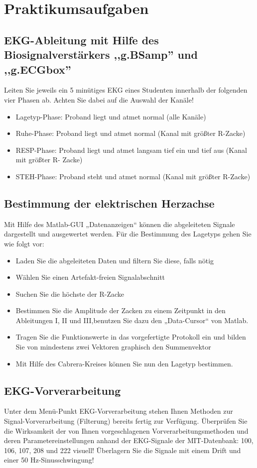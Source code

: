 \documentclass[a4paper,12pt,titlepage]{scrartcl}
\begin{document}
\section{Praktikumsaufgaben}
\subsection{EKG-Ableitung mit Hilfe des Biosignalverstärkers ,,g.BSamp'' und ,,g.ECGbox''}
Leiten Sie jeweils ein 5 minütiges EKG eines Studenten innerhalb der folgenden vier Phasen ab. Achten Sie dabei auf die Auswahl der Kanäle!
\begin{itemize}
    \item Lagetyp-Phase: Proband liegt und atmet normal (alle Kanäle)
    \item Ruhe-Phase: Proband liegt und atmet normal (Kanal mit größter R-Zacke)
    \item RESP-Phase: Proband liegt und atmet langsam tief ein und tief aus (Kanal mit größter R- Zacke)
    \item STEH-Phase: Proband steht und atmet normal (Kanal mit größter R-Zacke)
\end{itemize}

\subsection{Bestimmung der elektrischen Herzachse}
Mit Hilfe des Matlab-GUI „Datenanzeigen“ können die abgeleiteten Signale dargestellt und ausgewertet werden. Für die Bestimmung des Lagetyps gehen Sie wie folgt vor:
\begin{itemize}
    \item Laden Sie die abgeleiteten Daten und filtern Sie diese, falls nötig
    \item Wählen Sie einen Artefakt-freien Signalabschnitt
    \item Suchen Sie die höchste der R-Zacke
    \item Bestimmen Sie die Amplitude der Zacken zu einem Zeitpunkt in den Ableitungen I, II und III,benutzen Sie dazu den „Data-Cursor“ von Matlab.
    \item Tragen Sie die Funktionswerte in das vorgefertigte Protokoll ein und bilden Sie von mindestens zwei Vektoren graphisch den Summenvektor
    \item Mit Hilfe des Cabrera-Kreises können Sie nun den Lagetyp bestimmen.
\end{itemize}

\subsection{EKG-Vorverarbeitung}
Unter dem Menü-Punkt EKG-Vorverarbeitung stehen Ihnen Methoden zur Signal-Vorverarbeitung (Filterung) bereits fertig zur Verfügung.
Überprüfen Sie die Wirksamkeit der von Ihnen vorgeschlagenen Vorverarbeitungsmethoden und deren Parametereinstellungen anhand der EKG-Signale der MIT-Datenbank: 100, 106, 107, 208 und 222 visuell! Überlagern Sie die Signale mit einem Drift und einer 50 Hz-Sinusschwingung!
\end{document}
